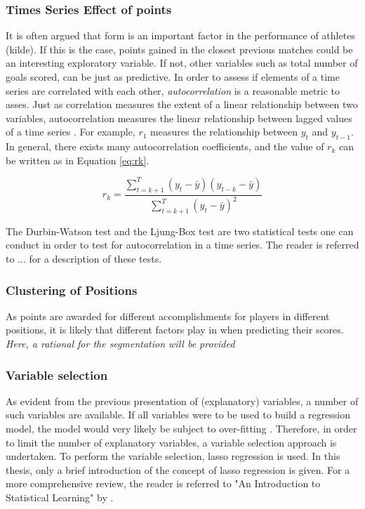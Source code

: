 \subsubsection{Times Series Effect of points}

It is often argued that form is an important factor in the performance of athletes (kilde). If this is the case, points gained in the closest previous matches could be an interesting exploratory variable. If not, other variables such as total number of goals scored, can be just as predictive. In order to assess if elements of a time series are correlated with each other, \textit{autocorrelation} is a reasonable metric to asses. Just as correlation measures the extent of a linear relationship between two variables, autocorrelation measures the linear relationship between lagged values of a time series \citep{Hyndman}. For example, $r_1$ measures the relationship between $y_t$ and $y_{t-1}$. In general, there exists many autocorrelation coefficients, and the value of $r_k$ can be written as in Equation \ref{eq:rk}. 


\begin{equation}\label{eq:rk}
    r_k = \frac{\sum_{t=k+1}^T(y_t-\bar{y})(y_{t-k}-\bar{y})}{\sum_{t=k+1}^T(y_t-\bar{y})^2}
\end{equation}

The Durbin-Watson test and the Ljung-Box test are two statistical tests one can conduct in order to test for autocorrelation in a time series. The reader is referred to ... for a description of these tests.

\subsubsection{Clustering of Positions}

As points are awarded for different accomplishments for players in different positions, it is likely that different factors play in when predicting their scores. \textit{Here, a rational for the segmentation will be provided}

\subsubsection{Variable selection}

As evident from the previous presentation of (explanatory) variables, a number of such variables are available. If all variables were to be used to build a regression model, the model would very likely be subject to over-fitting \citep{ISLR}. Therefore, in order to limit the number of explanatory variables, a variable selection approach is undertaken. To perform the variable selection, lasso regression is used. In this thesis, only a brief introduction of the concept of lasso regression is given. For a more comprehensive review, the reader is referred to "An Introduction to Statistical Learning" by \cite{ISLR}.\newpar

